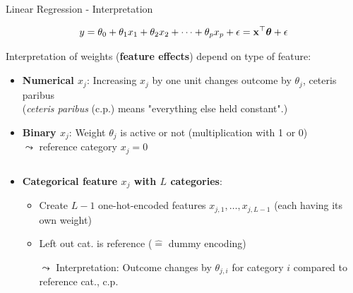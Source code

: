 \documentclass[11pt,compress,t,notes=noshow, aspectratio=169, xcolor=table]{beamer}
\begin{document}

\begin{frame}{Linear Regression - Interpretation}

 $$y = \theta_0 + \theta_1 x_1 + \theta_2 x_2 + \dots + \theta_p x_p + \epsilon = \mathbf{x}^\top \bm{\theta} + \epsilon$$

    Interpretation of weights (\textbf{feature effects}) depend on type of feature:
    \begin{itemize}[<+->]
        \item \textbf{Numerical $x_j$}: Increasing $x_j$ by one unit changes outcome by $\theta_j$, ceteris paribus \\ (\textit{ceteris paribus} (c.p.) means "everything else held constant".)
        \item \textbf{Binary $x_j$}: Weight $\theta_j$ is active or not (multiplication with 1 or 0)\\
        $\leadsto$ reference category $x_j = 0$
    \end{itemize}
%
\begin{columns}[T, totalwidth = \textwidth]
\begin{column}{0.62\textwidth}
    \begin{itemize}
        \item<3-> %
        \textbf{Categorical feature $x_j$ with $L$ categories}: 
        \begin{itemize}
            \item Create $L-1$ one-hot-encoded features $x_{j,1}, \hdots, x_{j,L-1}$ (each having its own weight)
            \item Left out cat. is reference ($\hat =$ dummy encoding)
            \item[$\leadsto$] Interpretation:
        Outcome changes by $\theta_{j,i}$ for category $i$ compared to reference cat.,  c.p.
        \end{itemize}

\end{itemize}
\end{column}
\end{columns}
\end{frame}
\end{document}
